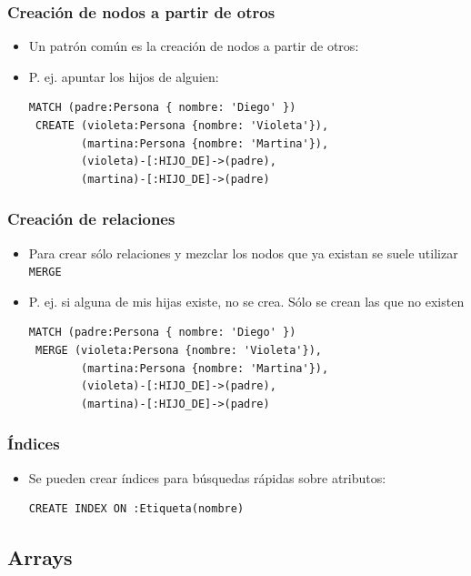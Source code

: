 \documentclass[14pt]{beamer}
\begin{document}
\begin{frame}[fragile]
  \frametitle{Creación de nodos a partir de otros}
  \begin{itemize}
  \item Un patrón común es la creación de nodos a partir de otros:
\item P. ej. apuntar los hijos de alguien:
\begin{lstlisting}[language=cypher]
MATCH (padre:Persona { nombre: 'Diego' })
 CREATE (violeta:Persona {nombre: 'Violeta'}),
        (martina:Persona {nombre: 'Martina'}),
        (violeta)-[:HIJO_DE]->(padre),
        (martina)-[:HIJO_DE]->(padre)
\end{lstlisting}
  \end{itemize}
\end{frame}

\begin{frame}[fragile]
  \frametitle{Creación de relaciones}
  \begin{itemize}
  \item Para crear sólo relaciones y mezclar los nodos que ya existan se
    suele utilizar {\tt MERGE}
\item P. ej. si alguna de mis hijas existe, no se crea. Sólo se crean las
  que no existen
\begin{lstlisting}[language=cypher]
MATCH (padre:Persona { nombre: 'Diego' })
 MERGE (violeta:Persona {nombre: 'Violeta'}),
        (martina:Persona {nombre: 'Martina'}),
        (violeta)-[:HIJO_DE]->(padre),
        (martina)-[:HIJO_DE]->(padre)
\end{lstlisting}
  \end{itemize}
\end{frame}


\begin{frame}[fragile]
  \frametitle{Índices}
  \begin{itemize}
  \item Se pueden crear índices para búsquedas rápidas sobre atributos:
\begin{lstlisting}[language=cypher]
CREATE INDEX ON :Etiqueta(nombre)
\end{lstlisting}
  \end{itemize}
\end{frame}



\subsection{Arrays}
\end{document}
